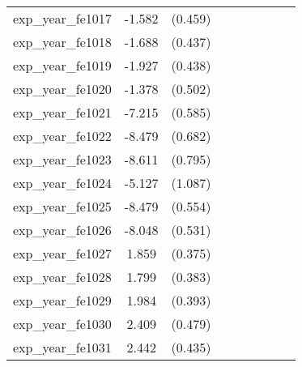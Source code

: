 {\begin{tabular}{l*{4}{cc}}
exp\_year\_fe1017&   -1.582\sym{***}&  (0.459)&                  &         &                  &         &                  &         \\
exp\_year\_fe1018&   -1.688\sym{***}&  (0.437)&                  &         &                  &         &                  &         \\
exp\_year\_fe1019&   -1.927\sym{***}&  (0.438)&                  &         &                  &         &                  &         \\
exp\_year\_fe1020&   -1.378\sym{**} &  (0.502)&                  &         &                  &         &                  &         \\
exp\_year\_fe1021&   -7.215\sym{***}&  (0.585)&                  &         &                  &         &                  &         \\
exp\_year\_fe1022&   -8.479\sym{***}&  (0.682)&                  &         &                  &         &                  &         \\
exp\_year\_fe1023&   -8.611\sym{***}&  (0.795)&                  &         &                  &         &                  &         \\
exp\_year\_fe1024&   -5.127\sym{***}&  (1.087)&                  &         &                  &         &                  &         \\
exp\_year\_fe1025&   -8.479\sym{***}&  (0.554)&                  &         &                  &         &                  &         \\
exp\_year\_fe1026&   -8.048\sym{***}&  (0.531)&                  &         &                  &         &                  &         \\
exp\_year\_fe1027&    1.859\sym{***}&  (0.375)&                  &         &                  &         &                  &         \\
exp\_year\_fe1028&    1.799\sym{***}&  (0.383)&                  &         &                  &         &                  &         \\
exp\_year\_fe1029&    1.984\sym{***}&  (0.393)&                  &         &                  &         &                  &         \\
exp\_year\_fe1030&    2.409\sym{***}&  (0.479)&                  &         &                  &         &                  &         \\
exp\_year\_fe1031&    2.442\sym{***}&  (0.435)&                  &         &                  &         &                  &         \\

\end{tabular}}
